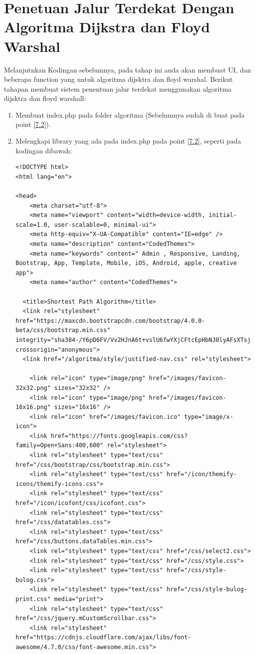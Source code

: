 \section{Penetuan Jalur Terdekat Dengan Algoritma Dijkstra dan Floyd Warshal}
Melanjutnkan Kodingan sebelumnya, pada tahap ini anda akan membuat UI, dan beberapa function yang untuk algoritma dijsktra dan floyd warshal. Berikut tahapan membuat sistem penentuan jalur terdekat menggunakan algoritma dijsktra dan floyd warshall:
\begin{enumerate}
    \item Membuat index.php pada folder algoritma (Sebelumnya sudah di buat pada point \ref{7.2}).
    \item Melengkapi library yang ada pada index.php pada point \ref{7.2}, seperti pada kodingan dibawah:
\begin{lstlisting}[caption=index.php Full Code]
<!DOCTYPE html>
<html lang="en">

<head>
    <meta charset="utf-8">
    <meta name="viewport" content="width=device-width, initial-scale=1.0, user-scalable=0, minimal-ui">
    <meta http-equiv="X-UA-Compatible" content="IE=edge" />
    <meta name="description" content="CodedThemes">
    <meta name="keywords" content=" Admin , Responsive, Landing, Bootstrap, App, Template, Mobile, iOS, Android, apple, creative app">
    <meta name="author" content="CodedThemes">

  <title>Shortest Path Algorithm</title>
  <link rel="stylesheet" href="https://maxcdn.bootstrapcdn.com/bootstrap/4.0.0-beta/css/bootstrap.min.css" integrity="sha384-/Y6pD6FV/Vv2HJnA6t+vslU6fwYXjCFtcEpHbNJ0lyAFsXTsjBbfaDjzALeQsN6M" crossorigin="anonymous">
  <link href="/algoritma/style/justified-nav.css" rel="stylesheet">
  
    <link rel="icon" type="image/png" href="/images/favicon-32x32.png" sizes="32x32" />
    <link rel="icon" type="image/png" href="/images/favicon-16x16.png" sizes="16x16" />
    <link rel="icon" href="/images/favicon.ico" type="image/x-icon">
    <link href="https://fonts.googleapis.com/css?family=Open+Sans:400,600" rel="stylesheet">
    <link rel="stylesheet" type="text/css" href="/css/bootstrap/css/bootstrap.min.css">
    <link rel="stylesheet" type="text/css" href="/icon/themify-icons/themify-icons.css">
    <link rel="stylesheet" type="text/css" href="/icon/icofont/css/icofont.css">
    <link rel="stylesheet" type="text/css" href="/css/datatables.css">
    <link rel="stylesheet" type="text/css" href="/css/buttons.dataTables.min.css">
    <link rel="stylesheet" type="text/css" href="/css/select2.css">
    <link rel="stylesheet" type="text/css" href="/css/style.css">
    <link rel="stylesheet" type="text/css" href="/css/style-bulog.css">
    <link rel="stylesheet" type="text/css" href="/css/style-bulog-print.css" media="print">
    <link rel="stylesheet" type="text/css" href="/css/jquery.mCustomScrollbar.css">
    <link rel="stylesheet" href="https://cdnjs.cloudflare.com/ajax/libs/font-awesome/4.7.0/css/font-awesome.min.css">


\end{lstlisting}
\end{enumerate}
